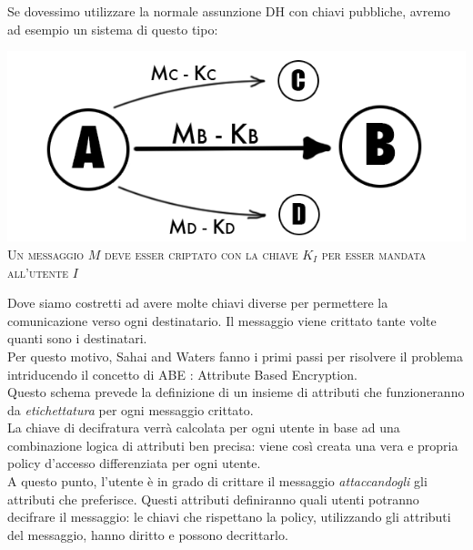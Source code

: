 Se dovessimo utilizzare la normale assunzione DH con chiavi pubbliche, avremo ad esempio un sistema di questo tipo:

\begin{center}
\begin{minipage}[c]{0.9\textwidth}
		\centering
		\includegraphics[keepaspectratio,width=\textwidth]{keying.png}\\
		{\small\scshape Un messaggio $M$ deve esser criptato con la chiave $K_I$ per esser mandata all'utente $I$}
\end{minipage}
\end{center}

Dove siamo costretti ad avere molte chiavi diverse per permettere la comunicazione verso ogni destinatario. Il messaggio viene crittato tante volte quanti sono i destinatari.\\[0.3cm]

Per questo motivo, Sahai and Waters \cite{sahai} fanno i primi passi per risolvere il problema intriducendo il concetto di ABE : Attribute Based Encryption.\\
Questo schema prevede la definizione di un insieme di attributi che funzioneranno da \emph{etichettatura} per ogni messaggio crittato.\\
La chiave di decifratura verrà calcolata per ogni utente in base ad una combinazione logica di attributi ben precisa: viene così creata una vera e propria policy d'accesso differenziata per ogni utente.\\[0.4cm]
A questo punto, l'utente è in grado di crittare il messaggio \emph{attaccandogli} gli attributi che preferisce. Questi attributi definiranno quali utenti potranno decifrare il messaggio: le chiavi che rispettano la policy, utilizzando gli attributi del messaggio, hanno diritto e possono decrittarlo.\\[0.2cm]

